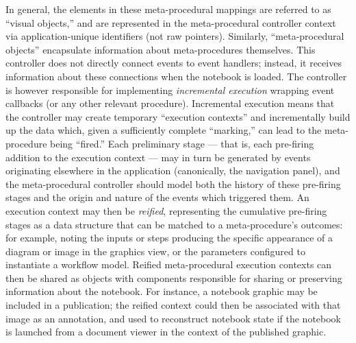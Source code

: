 \documentclass[11pt,letterpaper]{article}
\newcommand{\GUI}{\resizebox{!}{7pt}{\AcronymText{GUI}}}
\newcommand{\textscc}[1]{{\color{orr!35!black}{{%
						\fontfamily{Cabin-TLF}\fontseries{b}\selectfont{\textsc{\scriptsize{#1}}}}}}}
\newcommand{\AcronymText}[1]{{\textscc{#1}}}
\newcommand{\p}[1]{

\vspace{1em}#1}
\newcommand{\q}[1]{{\fontfamily{qcr}\selectfont ``}#1{\fontfamily{qcr}\selectfont ''}}
\begin{document}
{\p{In general, the \GUI{} elements in these 
meta-procedural mappings are referred to as 
\q{visual objects,} and are represented 
in the meta-procedural controller context via 
application-unique identifiers (not raw pointers).  
Similarly, \q{meta-procedural objects} encapsulate 
information about meta-procedures themselves.  
This controller does not directly connect 
\GUI{} events to event handlers; instead, it 
receives information about these connections when 
the notebook is loaded.  The controller is however 
responsible for implementing \textit{incremental 
execution} wrapping event callbacks (or any other 
relevant procedure).  Incremental execution 
means that the controller may create 
temporary \q{execution contexts} and incrementally 
build up the data which, given a sufficiently 
complete \q{marking,} can lead to the 
meta-procedure being \q{fired.}  Each 
preliminary stage --- that is, each pre-firing 
addition to the execution context --- may in 
turn be generated by events originating elsewhere 
in the application (canonically, the 
navigation panel), and the meta-procedural controller 
should model both the history of these pre-firing stages 
and the origin and nature of the events which 
triggered them.  An execution context 
may then be \textit{reified}, representing the 
cumulative pre-firing stages as a data structure 
that can be matched to a meta-procedure's 
outcomes: for example, noting the 
inputs or steps producing the specific appearance 
of a diagram or image in the graphics view, 
or the parameters configured to instantiate 
a workflow model.  Reified meta-procedural 
execution contexts can then be shared as 
objects with components responsible for 
sharing or preserving information about the 
notebook.  For instance, a notebook graphic may be 
included in a publication; the reified context 
could then be associated with that image as an 
annotation, and used to reconstruct notebook 
state if the notebook is launched from a 
document viewer in the context of the 
published graphic.}

}
\end{document}

